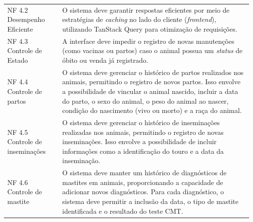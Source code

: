 \begin{tabframed}[!htb]
\begin{tabular}{|l|l|}
    \multicolumn{1}{|p{3.2cm}|}{\raggedright NF 4.2 Desempenho Eficiente}
                  &
    \multicolumn{1}{|p{12cm}|}{\raggedright O sistema deve garantir respostas eficientes por meio de estratégias de \textit{caching} no lado do cliente (\textit{frontend}), utilizando TanStack Query para otimização de requisições.}
    \\ \cline{1-2}

    \multicolumn{1}{|p{3cm}|}{\raggedright NF 4.3 Controle de Estado}
                  &

    \multicolumn{1}{|p{12cm}|}{\raggedright A interface deve impedir o registro de novas manutenções (como vacinas ou partos) caso o animal possua um \textit{status} de óbito ou venda já registrado.}
    \\ \cline{1-2}

    \multicolumn{1}{|p{3cm}|}{\raggedright NF 4.4 Controle de partos}
                  &
    \multicolumn{1}{|p{12cm}|}{\raggedright O sistema deve gerenciar o histórico de partos realizados nos animais, permitindo o registro de novos partos. Isso envolve a possibilidade de vincular o animal nascido, incluir a data do parto, o sexo do animal, o peso do animal ao nascer, condição do nascimento (vivo ou morto) e a raça do animal.}
    \\ \cline{1-2}

    \multicolumn{1}{|p{3cm}|}{\raggedright NF 4.5 Controle de inseminações}
                  &

    \multicolumn{1}{|p{12cm}|}{\raggedright O sistema deve gerenciar o histórico de inseminações realizadas nos animais, permitindo o registro de novas inseminações. Isso envolve a possibilidade de incluir informações como a identificação do touro e a data da inseminação.}
    \\ \cline{1-2}

    \multicolumn{1}{|p{3cm}|}{\raggedright NF 4.6 Controle de mastite}
                  &
    \multicolumn{1}{|p{12cm}|}{\raggedright O sistema deve manter um histórico de diagnósticos de mastites em animais, proporcionando a capacidade de adicionar novos diagnósticos. Para cada diagnóstico, o sistema deve permitir a inclusão da data, o tipo de mastite identificada e o resultado do teste CMT.}
    \\ \cline{1-2}
  \end{tabular}
  \fonte{}
\end{tabframed}

